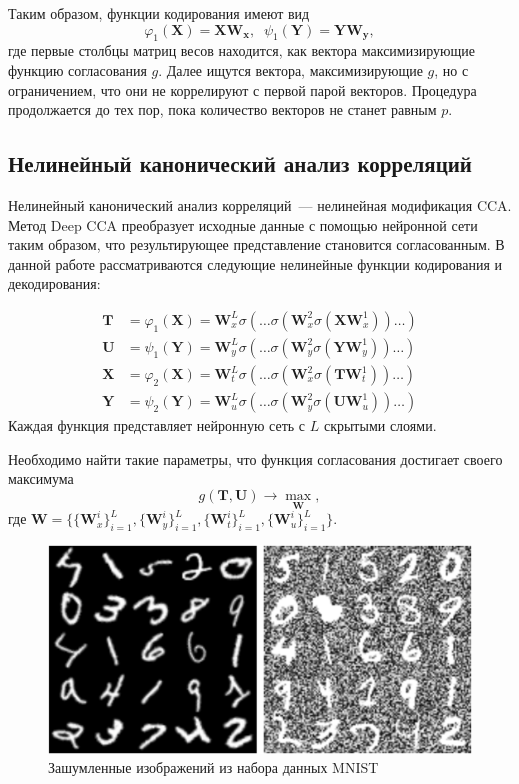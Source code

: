 \documentclass[12pt]{article}
\newcommand{\bx}{\mathbf{x}}
\newcommand{\by}{\mathbf{y}}
\newcommand{\bY}{\mathbf{Y}}
\newcommand{\bX}{\mathbf{X}}
\newcommand{\bT}{\mathbf{T}}
\newcommand{\bU}{\mathbf{U}}
\newcommand{\bW}{\mathbf{W}}
\begin{document}
	\noindent Таким образом, функции кодирования имеют вид
	\begin{equation}
		\varphi_1(\bX) = \bX \bW_{\bx} , \;\;
		\psi_1(\bY) = \bY \bW_{\by},
	\end{equation}
	где первые столбцы матриц весов находится, как вектора максимизирующие функцию согласования $g$. Далее ищутся вектора, максимизирующие $g$, но с ограничением, что они не коррелируют с первой парой векторов. Процедура продолжается до тех пор, пока количество векторов не станет равным $p$. 
	
	\subsection{Нелинейный канонический анализ корреляций}
	
	Нелинейный канонический анализ корреляций~--- нелинейная модификация CCA. Метод Deep CCA преобразует исходные данные с помощью нейронной сети таким образом, что результирующее представление становится согласованным. В данной работе рассматриваются следующие нелинейные функции кодирования и декодирования:
	
	\begin{align*}
		\bT &= \varphi_1(\bX) =  \bW_x^L \sigma(\dots \sigma(\bW_x^2 \sigma(\bX \bW_x^1)) \dots ) \\
		\bU &= \psi_1(\bY) =  \bW_y^L \sigma(\dots \sigma(\bW_y^2 \sigma(\bY \bW_y^1)) \dots ) \\
		\bX &= \varphi_2(\bX) =  \bW_t^L \sigma(\dots \sigma(\bW_x^2 \sigma(\bT \bW_t^1)) \dots ) \\
		\bY &= \psi_2(\bY) =  \bW_u^L \sigma(\dots \sigma(\bW_y^2 \sigma(\bU \bW_u^1)) \dots )
	\end{align*}
	Каждая функция представляет нейронную сеть с $L$ скрытыми слоями. 
	
	Необходимо найти такие параметры, что функция согласования достигает своего максимума
	\[
	g(\bT, \bU) \rightarrow \max_{\bW},
	\]
	где $\bW = \{\{\bW_x^i\}_{i=1}^L, \{\bW_y^i\}_{i=1}^L, \{\bW_t^i\}_{i=1}^L, \{\bW_u^i\}_{i=1}^L\}$.
	
	\begin{figure}[h!]
		\begin{center}
				\includegraphics[width=\linewidth]{figures/noisy_mnist}
		\end{center}
		\caption{Зашумленные изображений из набора данных MNIST}
		\label{fgr:1}
	\end{figure}
	
\end{document}
